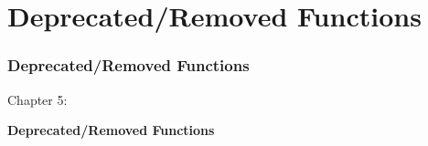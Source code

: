 %

\section{Deprecated/Removed Functions}
\begin{frame}[fragile]
	\frametitle{Deprecated/Removed Functions}

	\begin{center}\huge{Chapter 5:}\end{center}
	\begin{center}\huge{\color{typo3darkgrey}\textbf{Deprecated/Removed Functions}}\end{center}

\end{frame}

